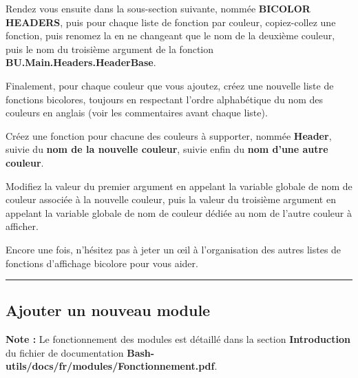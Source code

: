 \documentclass[a4paper,10pt]{article}
\begin{document}
\begin{justify}
	Rendez vous ensuite dans la sous-section suivante, nommée \textbf{BICOLOR HEADERS}, puis pour chaque liste de fonction par couleur, copiez-collez une fonction, puis renomez la en ne changeant que le nom de la deuxième couleur, puis le nom du troisième argument de la fonction \textbf{\color{mauve}BU.Main.Headers.HeaderBase}.
\end{justify}

\begin{justify}
	Finalement, pour chaque couleur que vous ajoutez, créez une nouvelle liste de fonctions bicolores,
toujours en respectant l'ordre alphabétique du nom des couleurs en anglais (voir les commentaires
avant chaque liste).
\end{justify}

\begin{justify}
	Créez une fonction pour chacune des couleurs à supporter, nommée \textbf{\color{mauve}Header}, suivie du \textbf{\color{mauve}nom de la nouvelle couleur}, suivie enfin du \textbf{\color{mauve}nom d'une autre couleur}.
\end{justify}

\begin{justify}
    Modifiez la valeur du premier argument en appelant la variable globale de nom de couleur associée à la nouvelle couleur, puis la valeur du troisième argument en appelant la variable globale de nom de couleur dédiée au nom de l'autre couleur à afficher.
\end{justify}

\begin{justify}
    Encore une fois, n'hésitez pas à jeter un œil à l'organisation des autres listes de fonctions d'affichage bicolore pour vous aider.
\end{justify}



\color{sec2}\par\noindent\rule{\textwidth}{0.4pt}\color{text}

\color{sec2}
\subsection{Ajouter un nouveau module}\color{text}

\begin{justify}
    \textbf{Note :} Le fonctionnement des modules est détaillé dans la section \textbf{\color{sec1}Introduction} du fichier de documentation \textbf{\color{path}Bash-utils/docs/fr/modules/Fonctionnement.pdf}.
\end{justify}
\end{document}
